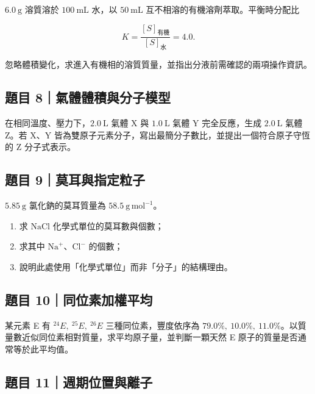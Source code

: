 \documentclass[11pt,a4paper]{article}
\providecommand{\tightlist}{%
  \setlength{\itemsep}{0pt}\setlength{\parskip}{0pt}}
\begin{document}
\(6.0\ \mathrm g\) 溶質溶於 \(100\ \mathrm{mL}\) 水，以 \(50\ \mathrm{mL}\) 互不相溶的有機溶劑萃取。平衡時分配比

\[
K=\frac{[S]_{\text{有機}}}{[S]_{\text{水}}}=4.0.
\]

忽略體積變化，求進入有機相的溶質質量，並指出分液前需確認的兩項操作資訊。

\subsection{題目 8｜氣體體積與分子模型}\label{ux984cux76ee-8ux6c23ux9ad4ux9ad4ux7a4dux8207ux5206ux5b50ux6a21ux578b}

在相同溫度、壓力下，\(2.0\ \mathrm L\) 氣體 X 與 \(1.0\ \mathrm L\) 氣體 Y 完全反應，生成 \(2.0\ \mathrm L\) 氣體 Z。若 X、Y 皆為雙原子元素分子，寫出最簡分子數比，並提出一個符合原子守恆的 Z 分子式表示。

\subsection{題目 9｜莫耳與指定粒子}\label{ux984cux76ee-9ux83abux8033ux8207ux6307ux5b9aux7c92ux5b50}

\(5.85\ \mathrm g\) 氯化鈉的莫耳質量為 \(58.5\ \mathrm{g\,mol^{-1}}\)。

\begin{enumerate}
\def\labelenumi{\arabic{enumi}.}
\tightlist
\item
  求 \(\mathrm{NaCl}\) 化學式單位的莫耳數與個數；
\item
  求其中 \(\mathrm{Na}^+\)、\(\mathrm{Cl}^-\) 的個數；
\item
  說明此處使用「化學式單位」而非「分子」的結構理由。
\end{enumerate}

\subsection{題目 10｜同位素加權平均}\label{ux984cux76ee-10ux540cux4f4dux7d20ux52a0ux6b0aux5e73ux5747}

某元素 E 有 \(^{24}E,\ ^{25}E,\ ^{26}E\) 三種同位素，豐度依序為 \(79.0\%,\ 10.0\%,\ 11.0\%\)。以質量數近似同位素相對質量，求平均原子量，並判斷一顆天然 E 原子的質量是否通常等於此平均值。

\subsection{題目 11｜週期位置與離子}\label{ux984cux76ee-11ux9031ux671fux4f4dux7f6eux8207ux96e2ux5b50}
\end{document}
